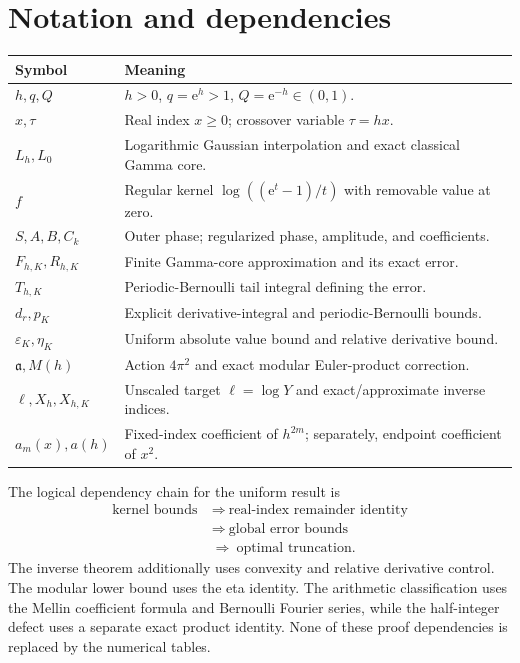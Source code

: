 \documentclass[11pt,a4paper]{article}
\numberwithin{equation}{section}
\theoremstyle{definition}
\newcommand{\ee}{\mathrm e}
\newcommand{\Act}{\mathfrak a}
\newcommand{\eps}{\varepsilon}
\begin{document}
\section{Notation and dependencies}
\label{app:notation}
\begin{center}\small
\begin{tabular}{@{}p{.22\linewidth}p{.71\linewidth}@{}}\toprule
Symbol&Meaning\\\midrule
$h,q,Q$&$h>0$, $q=\ee^h>1$, $Q=\ee^{-h}\in(0,1)$.\\
$x,\tau$&Real index $x\ge0$; crossover variable $\tau=hx$.\\
$L_h,L_0$&Logarithmic Gaussian interpolation and exact classical Gamma core.\\
$f$&Regular kernel $\log((\ee^t-1)/t)$ with removable value at zero.\\
$S,A,B,C_k$&Outer phase; regularized phase, amplitude, and coefficients.\\
$F_{h,K},R_{h,K}$&Finite Gamma-core approximation and its exact error.\\
$T_{h,K}$&Periodic-Bernoulli tail integral defining the error.\\
$d_r,p_K$&Explicit derivative-integral and periodic-Bernoulli bounds.\\
$\eps_K,\eta_K$&Uniform absolute value bound and relative derivative bound.\\
$\Act,M(h)$&Action $4\pi^2$ and exact modular Euler-product correction.\\
$\ell,X_h,X_{h,K}$&Unscaled target $\ell=\log Y$ and exact/approximate inverse indices.\\
$a_m(x),a(h)$&Fixed-index coefficient of $h^{2m}$; separately, endpoint coefficient of $x^2$.\\\bottomrule
\end{tabular}
\end{center}

The logical dependency chain for the uniform result is
\[
\begin{aligned}
\text{kernel bounds}&\ \Longrightarrow\ \text{real-index remainder identity}\\
&\ \Longrightarrow\ \text{global error bounds}\\
&\ \Longrightarrow\ \text{optimal truncation}.
\end{aligned}
\]
The inverse theorem additionally uses convexity and relative derivative control. The modular lower bound uses the eta identity. The arithmetic classification uses the Mellin coefficient formula and Bernoulli Fourier series, while the half-integer defect uses a separate exact product identity. None of these proof dependencies is replaced by the numerical tables.
\end{document}
